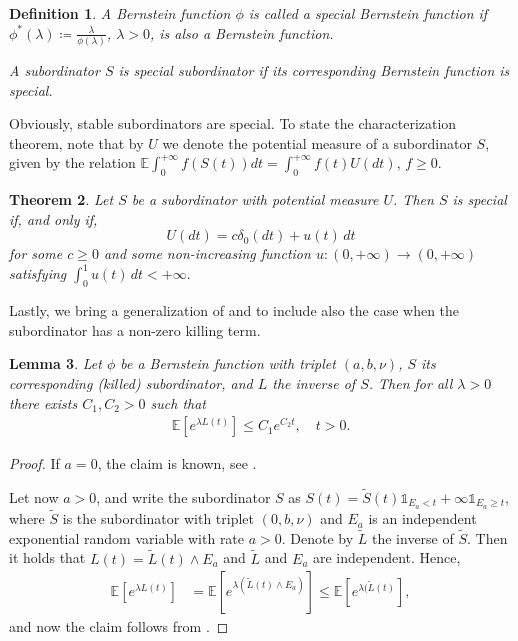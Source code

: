 \documentclass[reqno]{amsart}
\newtheorem{theorem}{Theorem}[section] %
\newtheorem{lemma}[theorem]{Lemma}
\newtheorem{definition}[theorem]{Definition}
\theoremstyle{remark}
\numberwithin{equation}{section} %
\newcommand{\EE}{\mathds{E}}
\newcommand{\wt}{\widetilde}
\newcommand{\1}{\mathds{1}}
\begin{document}
	\begin{definition}
		A Bernstein function $\phi$ is called a special Bernstein function if $\phi^*(\lambda)\coloneqq \frac{\lambda}{\phi(\lambda)}$, $\lambda>0$, is also a Bernstein function.
		
		A subordinator $S$ is special subordinator if its corresponding Bernstein function is special.
	\end{definition}
	Obviously, stable subordinators are special. To state the  characterization theorem, note that by $U$ we denote the potential measure of a subordinator $S$, given by the relation $\EE\int_0^{+\infty} f(S(t))dt=\int_0^{+\infty} f(t) U(dt)$, $f\ge0$.
	\begin{theorem}
		Let $S$ be a subordinator with potential measure $U$. Then $S$ is special if, and only if,
		$$
		U(dt) = c \delta_0(dt) + u(t)\,dt 
		$$
		for some $c \ge 0$ and some non-increasing function $u : (0,{+\infty}) \to (0,+\infty)$ satisfying $
		\int_0^1 u(t)\,dt < +\infty.$
	\end{theorem}
	
	Lastly, we bring a generalization of \cite[Lemma A.3]{daniel24} and \cite[Lemma A.1]{Jorge2023a} to include also the case when the subordinator has a non-zero killing term.
	\begin{lemma}\label{daniel}
		Let $\phi$ be a Bernstein function with triplet $(a,b,\nu)$, $S$ its corresponding (killed) subordinator, and $L$ the inverse of $S$. Then for all $\lambda >0$ there exists $C_1,C_2>0$ such that
		\begin{align}
			\EE[e^{\lambda L(t)}]\le C_1e^{C_2 t},\quad t>0. 
		\end{align}
	\end{lemma}
	\begin{proof}
		If $a=0$, the claim is known, see \cite[Lemma A.3]{daniel24}.
		
		Let now $a>0$, and write the subordinator $S$ as $S(t)=\wt S(t)\1_{E_a<t}+\infty\1_{E_a\ge t}$, where $\wt S$ is the subordinator with triplet $(0,b,\nu)$ and $E_a$ is an independent exponential random variable with rate $a>0$. Denote by $\wt L$ the inverse of $\wt S$. Then it holds that $L(t)=\wt L(t)\wedge E_a$ and $\wt L$ and $E_a$ are independent. Hence,
		\begin{align}
			\EE[e^{\lambda L(t)}]&=\EE[e^{\lambda (\wt L(t)\wedge E_a)}]\le\EE[e^{\lambda (\wt L(t)}],
		\end{align}
		and now the claim follows from \cite[Lemma A.3]{daniel24}.
	\end{proof}
	
\end{document}
